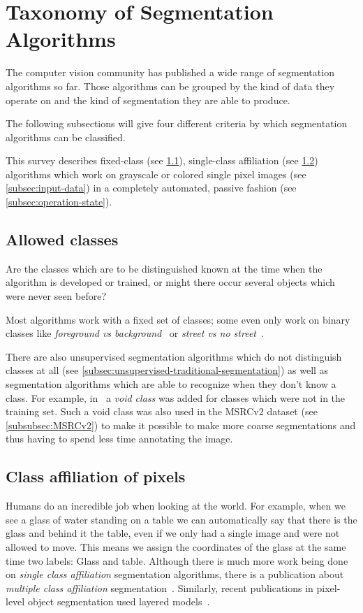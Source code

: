 
\section{Taxonomy of Segmentation Algorithms}\label{sec:taxonomy}
The computer vision community has published a wide range of segmentation
algorithms so far. Those algorithms can be grouped by the kind of data they
operate on and the kind of segmentation they are able to produce.

The following subsections will give four different criteria by which
segmentation algorithms can be classified.

This survey describes fixed-class (see \cref{subsec:allowed-classes}),
single-class affiliation (see \cref{subsec:class-affiliation}) algorithms which
work on grayscale or colored single pixel images (see \cref{subsec:input-data})
in a completely automated, passive fashion (see \cref{subsec:operation-state}).

\subsection{Allowed classes}\label{subsec:allowed-classes}
Are the classes which are to be distinguished known at the time when the
algorithm is developed or trained, or might there occur several objects which
were never seen before?

Most algorithms work with a fixed set of classes; some even only work on binary
classes like \textit{foreground vs
background}~\cite{4228537,carreira2010constrained} or \textit{street vs no
street}~\cite{bittel2015pixel}.

There are also unsupervised segmentation algorithms which do not distinguish
classes at all (see \cref{subsec:unsupervised-traditional-segmentation}) as
well as segmentation algorithms which are able to recognize when they don't
know a class. For example, in~\cite{gould2008multi} a
\textit{void class} was added for classes which were not in the training set.
Such a void class was also used in the MSRCv2 dataset (see
\cref{subsubsec:MSRCv2}) to make it possible to make more coarse segmentations
and thus having to spend less time annotating the image.


\subsection{Class affiliation of pixels}\label{subsec:class-affiliation}
Humans do an incredible job when looking at the world. For example, when we
see a glass of water standing on a table we can automatically say that there is
the glass and behind it the table, even if we only had a single image and were
not allowed to move. This means we assign the coordinates of the glass at the
same time two labels: Glass and table. Although there is much more work being
done on \textit{single class affiliation} segmentation algorithms, there is a
publication about \textit{multiple class affiliation}
segmentation~\cite{levin2008spectral}. Similarly, recent publications in
pixel-level object segmentation used layered models~\cite{yang2012layered}.


